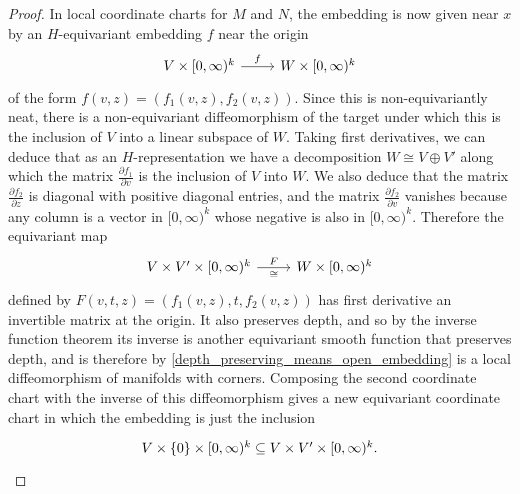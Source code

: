 \documentclass[11pt]{amsart}
\theoremstyle{definition}
\numberwithin{equation}{section}
\numberwithin{figure}{section}
\begin{document}
\begin{proof}
In local coordinate charts for $M$ and $N$, the embedding is now given near $x$ by an $H$-equivariant embedding $f$ near the origin %
\[ \begin{tikzcd}
	V\times [0, \infty)^k \rar{f} & W\times [0, \infty)^k %
\end{tikzcd} \]
of the form $f(v, z)=(f_1(v,z), f_2(v,z))$. 
Since this is non-equivariantly neat, there is a non-equivariant diffeomorphism of the target under which this is the inclusion of $V$ into a linear subspace of $W$. Taking first derivatives, we can deduce that as an $H$-representation we have a decomposition $W \cong V \oplus V'$ along which the matrix $\frac{\partial{f_1}}{{\partial v}}$ is the inclusion of $V$ into $W$. We also deduce that the matrix $\frac{\partial{f_2}}{{\partial z}}$ is diagonal with positive diagonal entries, and the matrix $\frac{\partial{f_2}}{{\partial v}}$ vanishes because any column is a vector in $[0,\infty)^k$ whose negative is also in $[0,\infty)^k$. Therefore the equivariant map
\[ \begin{tikzcd}
	V \times V' \times [0,\infty)^k \rar{F}[swap]{\cong} & W\times [0, \infty)^k
\end{tikzcd} \]
defined by $F(v,t,z) = (f_1(v,z),t,f_2(v,z))$ has first derivative an invertible matrix at the origin. It also preserves depth, and so by the inverse function theorem its inverse is another equivariant smooth function that preserves depth, and is therefore by \autoref{depth_preserving_means_open_embedding} is a local diffeomorphism of manifolds with corners. Composing the second coordinate chart with the inverse of this diffeomorphism gives a new equivariant coordinate chart in which the embedding is just the inclusion
\[ \begin{tikzcd}
	V \times \{0\} \times [0,\infty)^k \subseteq V \times V' \times [0,\infty)^k.
\end{tikzcd} \]
%
%
\end{proof}
\end{document}
